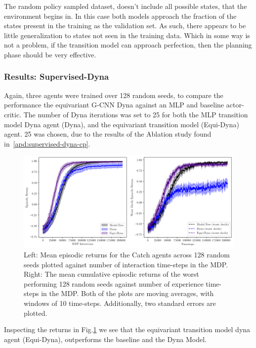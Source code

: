 The random policy sampled dataset, doesn't include all possible states, that the environment begins in. In this case both models approach the fraction of the states present in the training as the validation set. As such, there appears to be little generalization to states not seen in the training data. Which in some way is not a problem, if the transition model can approach perfection, then the planning phase should be very effective.

\subsubsection{Results: Supervised-Dyna}
Again, three agents were trained over 128 random seeds, to compare the performance the equivariant G-CNN Dyna against an MLP and baseline actor-critic. The number of Dyna iterations was set to 25 for both the MLP transition model Dyna agent (Dyna), and the equivariant transition model (Equi-Dyna) agent. 25 was chosen, due to the results of the Ablation study found in~\ref{apd:supervised-dyna-cp}.

\begin{figure}
	\label{fig:supervised-dyna-catch}
	\centering
	\includegraphics[width=\textwidth]{Figures/Expert_Dyna_Catch_pr2.png}
	\caption{Left: Mean episodic returns for the Catch agents across 128 random seeds
		plotted against number of interaction time-steps in the MDP. Right: The mean
		cumulative episodic returns of the worst performing 128 random seeds against
		number of experience time-steps in the MDP. Both of the plots are moving
		averages, with windows of 10 time-steps. Additionally, two standard errors are
		plotted.}
\end{figure}

Inspecting the returns in Fig.\ref{fig:supervised-dyna-catch} we see that the equivariant transition model dyna agent (Equi-Dyna), outperforms the baseline and the Dyna Model.


